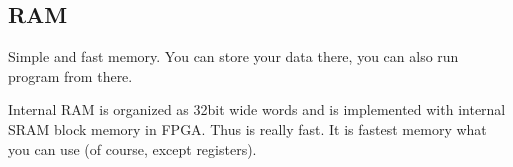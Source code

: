 \subsection{RAM}

Simple and fast memory. You can store your data there, you can also run program
from there.

Internal RAM is organized as 32bit wide words and is implemented with internal
SRAM block memory in FPGA. Thus is really fast. It is fastest memory what you
can use (of course, except registers).
